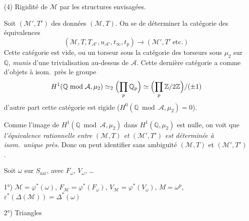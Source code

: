 \documentclass[11pt,a4paper]{article}
\begin{document}
(4) Rigidité de $\mathcal{M}$ par les structures envisagées.

Soit $(\mathcal{M}',T')$ \ill{} des  données
 $(\mathcal{M},T)$. On se  de déterminer
la catégorie des équivalences
\[
(\mathcal{M}, T, T_{\mathcal{A}'}, u_{\mathcal{A}'}, t_\infty, t_p)
\longrightarrow (\mathcal{M}', T' \ \mathrm{etc.})
\]
Cette catégorie est vide, ou  un torseur sous la catégorie
des torseurs sous $\mu_2$ sur $\mathbb{Q}$, \emph{munis} d'une trivialisation
\struck{\ill{}} au-dessus de $\mathcal{A}$. Cette dernière catégorie a comme
\struck{\ill{}} \ill{} d'objets à isom.\ près le groupe
\[
H^1(\mathbb{Q} \bmod \mathcal{A}, \mu_2) \simeq_2
\Bigl(\prod_p \mathbb{Q}_p\Bigr) \simeq
\Bigl(\prod_p \mathbb{Z}/2\mathbb{Z}\Bigr)/(\pm 1)
\]
d'autre part cette catégorie est rigide
($H^0(\mathbb{Q} \bmod \mathcal{A}, \mu_2) = 0$).

Comme l'image de $H^1(\mathbb{Q} \bmod \mathcal{A}, \mu_2)$ dans
$H^1(\mathbb{Q}, \mu_2)$ est nulle, on voit que \emph{l'équivalence
rationnelle entre $(\mathcal{M},T)$ et $(\mathcal{M}',T')$ est déterminée à
isom.\ unique près}. Donc on peut identifier sans ambiguïté $(\mathcal{M},T)$
et $(\mathcal{M}',T')$.


Soit $\omega$ sur $S_{\mathrm{zar}}$, avec $F_\omega$, $V_\omega$, \ldots\

1°) $\mathcal{M} = \varphi^*(\omega)$, \quad
$F_{\mathcal{M}} = \varphi^*(F_\omega)$, \quad
$V_{\mathcal{M}} = \varphi^*(V_\omega)$, \qquad $M = \omega^{p}$,
$\varepsilon^*(\Delta(\mathcal{M})) = \Delta^*(\omega)$

2°) Triangles

\end{document}
